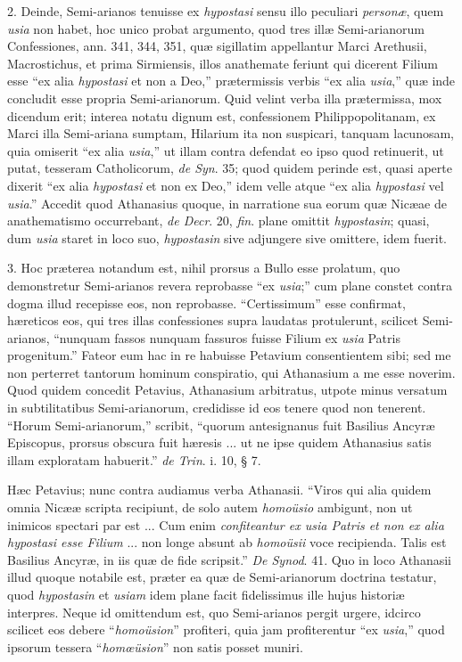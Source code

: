 2. Deinde,
Semi-arianos tenuisse ex \emph{hypostasi} sensu illo peculiari \emph{personæ},
quem \emph{usia} non habet, hoc unico probat argumento, quod tres illæ
Semi-arianorum Confessiones, ann. 341, 344, 351, quæ sigillatim
appellantur Marci Arethusii, Macrostichus, et prima Sirmiensis, illos
anathemate feriunt qui dicerent Filium esse ``ex alia \emph{hypostasi}
et non a Deo,'' prætermissis verbis ``ex alia \emph{usia},'' quæ inde
concludit esse propria Semi-arianorum. Quid velint verba illa prætermissa,
mox dicendum erit; interea notatu dignum est, confessionem
Philippopolitanam, ex Marci illa Semi-ariana sumptam, Hilarium ita non
suspicari, tanquam lacunosam, quia omiserit ``ex alia \emph{usia},'' ut
illam contra defendat eo ipso quod retinuerit, ut putat, tesseram
Catholicorum, \emph{de Syn}. 35; quod quidem perinde est, quasi aperte
dixerit ``ex alia \emph{hypostasi} et non ex Deo,'' idem velle atque ``ex
alia \emph{hypostasi} vel \emph{usia}.'' Accedit quod Athanasius quoque,
in narratione sua eorum quæ Nicæae de anathematismo occurrebant, \emph{de
Decr}. 20, \emph{fin}. plane omittit \emph{hypostasin}; quasi, dum \emph{usia}
staret in loco suo, \emph{hypostasin} sive adjungere sive omittere,
idem fuerit.

3. Hoc præterea
notandum est, nihil prorsus a Bullo esse prolatum, quo demonstretur
Semi-arianos revera reprobasse ``ex \emph{usia};'' cum plane constet
contra dogma illud recepisse eos, non reprobasse. ``Certissimum'' esse
confirmat, hæreticos eos, qui tres illas confessiones supra laudatas
protulerunt, scilicet Semi-arianos, ``nunquam fassos nunquam
fassuros fuisse Filium ex \emph{usia} Patris progenitum.'' Fateor eum
hac in re habuisse Petavium consentientem sibi; sed me non perterret
tantorum hominum conspiratio, qui Athanasium a me esse noverim. Quod
quidem concedit Petavius, Athanasium arbitratus, utpote minus versatum
in subtilitatibus Semi-arianorum, credidisse id eos tenere quod non
tenerent. ``Horum Semi-arianorum,'' scribit, ``quorum antesignanus fuit
Basilius Ancyræ Episcopus, prorsus obscura fuit hæresis ... ut ne
ipse quidem Athanasius satis illam exploratam habuerit.'' \emph{de Trin}.
i. 10, § 7.

Hæc
Petavius; nunc contra audiamus verba Athanasii. ``Viros qui alia quidem
omnia Nicææ scripta recipiunt, de solo autem \emph{homoüsio}
ambigunt, non ut inimicos spectari par est ... Cum enim \emph{confiteantur
ex usia Patris et non ex alia hypostasi esse Filium} ... non longe
absunt ab \emph{homoüsii} voce recipienda. Talis est Basilius Ancyræ,
in iis quæ de fide scripsit.'' \emph{De Synod}. 41. Quo in loco
Athanasii illud quoque notabile est, præter ea quæ de Semi-arianorum
doctrina testatur, quod \emph{hypostasin} et \emph{usiam} idem plane
facit fidelissimus ille hujus historiæ interpres. Neque id omittendum
est, quo Semi-arianos pergit urgere, idcirco scilicet eos debere ``\emph{homoüsion}''
profiteri, quia jam profiterentur ``ex \emph{usia},'' quod ipsorum
tessera ``\emph{homœüsion}'' non satis posset muniri.

